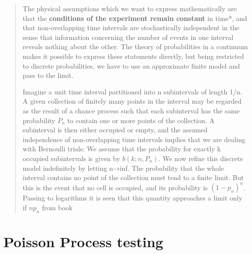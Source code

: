 \begin{quotation}
    The physical assumptions which we want to express mathematically are that the \textbf{conditions of the experiment remain constant} in time*, and that non-overlapping time intervals are stochastically independent in the sense that information concerning the number of events in one interval reveals nothing about the other. The theory of probabilities in a continuum makes it possible to express these statements directly, but being restricted to discrete probabilities, we have to use an approximate finite model and pass to the limit.

    Imagine a unit time interval partitioned into n subintervals of length 1/n. A given collection of finitely many points in the interval may be regarded as the result of a chance process such that each subinterval has the same probability $P_{n}$ to contain one or more points of the collection. A subinterval is then either occupied or empty, and the assumed independence of non-overlapping time intervals implies that we are dealing with Bernoulli trials: We assume that the probability for exactly k occupied subintervals is given by $b(k;n,P_{n})$. We now refine this discrete model indefinitely by letting n→inf. The probability that the whole interval contains no point of the collection must tend to a finite limit. But this is the event that no cell is occupied, and its probability is $(1-p_{n})^{n}$. Passing to logarithms it is seen that this quantity approaches a limit only if $np_{n}$
    from book \cite{fellerIntroductionProbabilityTheory1968}
\end{quotation}



\section{Poisson Process testing}

